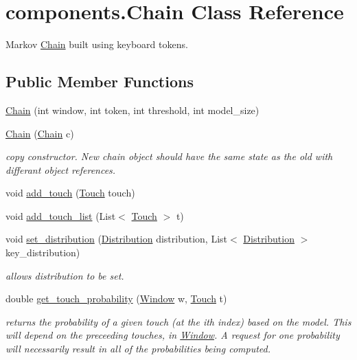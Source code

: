 \hypertarget{classcomponents_1_1_chain}{}\section{components.\+Chain Class Reference}
\label{classcomponents_1_1_chain}


Markov \hyperlink{classcomponents_1_1_chain}{Chain} built using keyboard tokens.  


\subsection*{Public Member Functions}
\begin{DoxyCompactItemize}
\item 
\hyperlink{classcomponents_1_1_chain_afd25b8fbf65a81889a812eeb63b9520e}{Chain} (int window, int token, int threshold, int model\+\_\+size)
\item 
\hyperlink{classcomponents_1_1_chain_ac35b83e35e0bd5295eb873e2a5a2f989}{Chain} (\hyperlink{classcomponents_1_1_chain}{Chain} c)
\begin{DoxyCompactList}\small\item\em copy constructor. New chain object should have the same state as the old with differant object references. \end{DoxyCompactList}\item 
void \hyperlink{classcomponents_1_1_chain_a9a8aa7996f3f4b65a0f0dbbddd84f14b}{add\+\_\+touch} (\hyperlink{classcomponents_1_1_touch}{Touch} touch)
\item 
void \hyperlink{classcomponents_1_1_chain_a2eb35304ee80f15c741a986a214e663b}{add\+\_\+touch\+\_\+list} (List$<$ \hyperlink{classcomponents_1_1_touch}{Touch} $>$ t)
\item 
void \hyperlink{classcomponents_1_1_chain_a4184b4a5a7bd8b2412e7543c2db91af1}{set\+\_\+distribution} (\hyperlink{classcomponents_1_1_distribution}{Distribution} distribution, List$<$ \hyperlink{classcomponents_1_1_distribution}{Distribution} $>$ key\+\_\+distribution)
\begin{DoxyCompactList}\small\item\em allows distribution to be set. \end{DoxyCompactList}\item 
double \hyperlink{classcomponents_1_1_chain_a96cec1762b6f69856f54aad9e37b04a7}{get\+\_\+touch\+\_\+probability} (\hyperlink{classcomponents_1_1_window}{Window} w, \hyperlink{classcomponents_1_1_touch}{Touch} t)
\begin{DoxyCompactList}\small\item\em returns the probability of a given touch (at the i\textquotesingle{}th index) based on the model. This will depend on the preceeding touches, in \hyperlink{classcomponents_1_1_window}{Window}. A request for one probability will necessarily result in all of the probabilities being computed. \end{DoxyCompactList}\item 

\end{DoxyCompactItemize}
